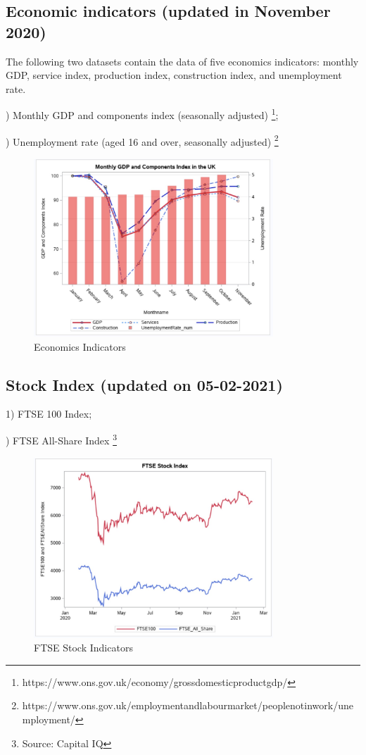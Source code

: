 \documentclass[12pt, a4paper]{report}
\begin{document}
\subsection{Economic indicators (updated in November 2020)} 
The following two datasets contain the data of five economics indicators: monthly GDP, service index, 
production index, construction index, and unemployment rate.\par
{}) Monthly GDP and components index (seasonally adjusted)
\footnote[4]{https://www.ons.gov.uk/economy/grossdomesticproductgdp/};\par
{}) Unemployment rate (aged 16 and over, seasonally adjusted)
\footnote[5]{https://www.ons.gov.uk/employmentandlabourmarket/peoplenotinwork/unemployment/}
\begin{figure}[H] 
\centering 
\includegraphics[width=9cm]{economics.jpg} 
\caption{Economics Indicators}
\end{figure}
    
\subsection{Stock Index (updated on 05-02-2021)}
1) FTSE 100 Index;\par
{}) FTSE All-Share Index
\footnote[6]{Source: Capital IQ}
\begin{figure}[H] 
\centering 
\includegraphics[width=9cm]{ftse.jpg} 
\caption{FTSE Stock Indicators}
\end{figure}
        
\end{document}
